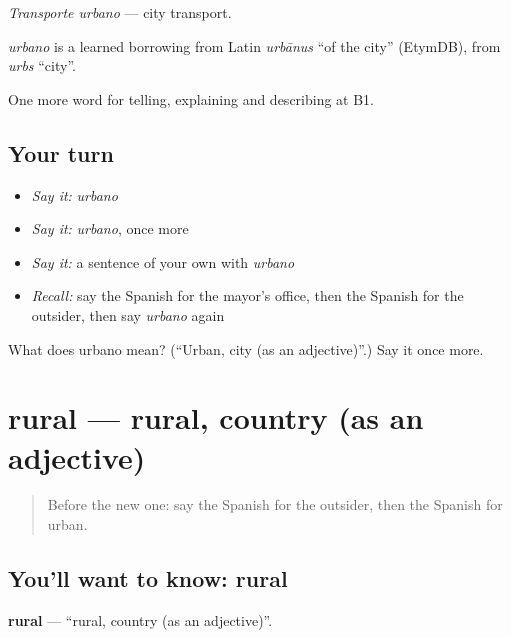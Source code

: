 \emph{Transporte urbano} — city transport.

\begin{cousinweb}
\emph{urbano} is a learned borrowing from Latin \emph{urbānus} \textquotedblleft{}of the city\textquotedblright{} (EtymDB), from \emph{urbs} \textquotedblleft{}city\textquotedblright{}.
\end{cousinweb}

\begin{grammarlens}[title={What you've built}]
One more word for telling, explaining and describing at B1.
\end{grammarlens}

\subsection*{Your turn}
\begin{itemize}
\raggedright
  \item \emph{Say it:} \emph{urbano}
  \item \emph{Say it:} \emph{urbano}, once more
  \item \emph{Say it:} a sentence of your own with \emph{urbano}
  \item \emph{Recall:} say the Spanish for the mayor’s office, then the Spanish for the outsider, then say \emph{urbano} again
\end{itemize}

\begin{tcolorbox}[breakable,colback=teal!4,colframe=teal!35!black,title={Before you move on}]
What does urbano mean? (\textquotedblleft{}Urban, city (as an adjective)\textquotedblright{}.) Say it once more.
\end{tcolorbox}
\section[rural]{rural — rural, country (as an adjective)}

\label{lesson:ES-C684-rural}



\begin{quote}
Before the new one: say the Spanish for the outsider, then the Spanish for urban.
\end{quote}

\subsection*{You'll want to know: rural}
\textbf{rural} — \textquotedblleft{}rural, country (as an adjective)\textquotedblright{}.

